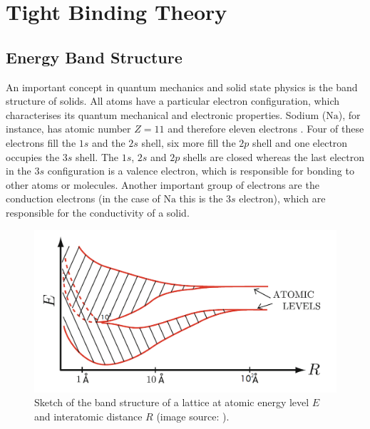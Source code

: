
\section{Tight Binding Theory}

\subsection{Energy Band Structure}

An important concept in quantum mechanics and solid state physics is the band structure of solids. All atoms have a particular electron configuration, which characterises its quantum mechanical and electronic properties. Sodium ($\mathrm{Na}$), for instance, has atomic number $Z=11$ and therefore eleven electrons \cite{Quinn2018}. Four of these electrons fill the $1s$ and the $2s$ shell, six more fill the $2p$ shell and one electron occupies the $3s$ shell. The $1s$, $2s$ and $2p$ shells are closed whereas the last electron in the $3s$ configuration is a valence electron, which is responsible for bonding to other atoms or molecules. Another important group of electrons are the conduction electrons (in the case of $\mathrm{Na}$ this is the $3s$ electron), which are responsible for the conductivity of a solid.

\begin{figure}[H]
    \centering
    \includegraphics[width=.5\textwidth]{img/band_structure.PNG}
    \caption{Sketch of the band structure of a lattice at atomic energy level $E$ and interatomic distance $R$ \cite{Quinn2018} (image source: \textcite{Quinn2018}).}
    \label{fig:band_structure}
\end{figure}


